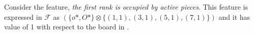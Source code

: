 Consider the feature, \textsl{the first rank is occupied by active pieces}.  This feature is expressed in $\mathcal{F}$ as $(\{o*,O*\}\otimes\{(1,1),(3,1),(5,1),(7,1)\})$ and it has value of 1 with respect to the board in \myrefboard.


